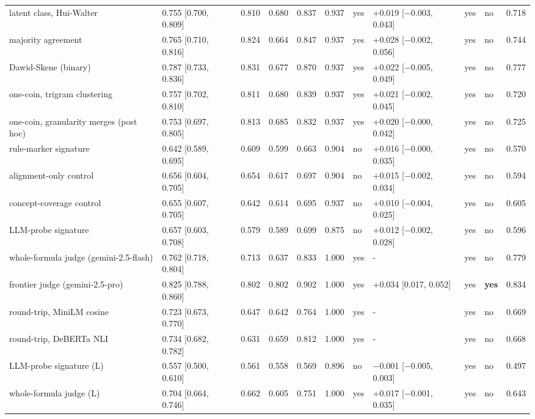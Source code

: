 \documentclass[11pt,letterpaper]{article}
\begin{document}
\begin{landscape}
{\begin{longtable}
{}latent class, Hui-Walter & 0.755 [0.700, 0.809] & 0.810 & 0.680 & 0.837 & 0.937 & yes & +0.019 [$-$0.003, 0.043] & yes & no & 0.718 \\
{}majority agreement & 0.765 [0.710, 0.816] & 0.824 & 0.664 & 0.847 & 0.937 & yes & +0.028 [$-$0.002, 0.056] & yes & no & 0.744 \\
{}Dawid-Skene (binary) & 0.787 [0.733, 0.836] & 0.831 & 0.677 & 0.870 & 0.937 & yes & +0.022 [$-$0.005, 0.049] & yes & no & 0.777 \\
{}one-coin, trigram clustering & 0.757 [0.702, 0.810] & 0.811 & 0.680 & 0.839 & 0.937 & yes & +0.021 [$-$0.002, 0.045] & yes & no & 0.720 \\
{}one-coin, granularity merges (post hoc) & 0.753 [0.697, 0.805] & 0.813 & 0.685 & 0.832 & 0.937 & yes & +0.020 [$-$0.000, 0.042] & yes & no & 0.725 \\
{}rule-marker signature & 0.642 [0.589, 0.695] & 0.609 & 0.599 & 0.663 & 0.904 & no & +0.016 [$-$0.000, 0.035] & yes & no & 0.570 \\
{}alignment-only control & 0.656 [0.604, 0.705] & 0.654 & 0.617 & 0.697 & 0.904 & no & +0.015 [$-$0.002, 0.034] & yes & no & 0.594 \\
{}concept-coverage control & 0.655 [0.607, 0.705] & 0.642 & 0.614 & 0.695 & 0.937 & no & +0.010 [$-$0.004, 0.025] & yes & no & 0.605 \\
{}LLM-probe signature & 0.657 [0.603, 0.708] & 0.579 & 0.589 & 0.699 & 0.875 & no & +0.012 [$-$0.002, 0.028] & yes & no & 0.596 \\
{}whole-formula judge (gemini-2.5-flash) & 0.762 [0.718, 0.804] & 0.713 & 0.637 & 0.833 & 1.000 & yes & - & yes & no & 0.779 \\
{}frontier judge (gemini-2.5-pro) & 0.825 [0.788, 0.860] & 0.802 & 0.802 & 0.902 & 1.000 & yes & +0.034 [0.017, 0.052] & yes & \textbf{yes} & 0.834 \\
{}round-trip, MiniLM cosine & 0.723 [0.673, 0.770] & 0.647 & 0.642 & 0.764 & 1.000 & yes & - & yes & no & 0.669 \\
{}round-trip, DeBERTa NLI & 0.734 [0.682, 0.782] & 0.631 & 0.659 & 0.812 & 1.000 & yes & - & yes & no & 0.668 \\
{}LLM-probe signature (L) & 0.557 [0.500, 0.610] & 0.561 & 0.558 & 0.569 & 0.896 & no & $-$0.001 [$-$0.005, 0.003] & yes & no & 0.497 \\
{}whole-formula judge (L) & 0.704 [0.664, 0.746] & 0.662 & 0.605 & 0.751 & 1.000 & yes & +0.017 [$-$0.001, 0.035] & yes & no & 0.643 \\

\end{longtable}}
\end{landscape}
\end{document}
